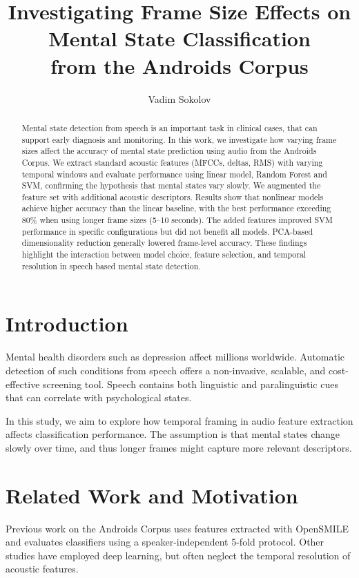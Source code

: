 \documentclass[conference]{IEEEtran}
\begin{document}
\title{\textbf{Investigating Frame Size Effects on Mental State Classification\\ from the Androids Corpus}}


\author{Vadim Sokolov}
\date{}

\maketitle

\begin{abstract}
Mental state detection from speech is an important task in clinical cases, that can support early diagnosis and monitoring. 
In this work, we investigate how varying frame sizes affect the accuracy of mental state prediction using audio from the Androids Corpus. 
We extract standard acoustic features (MFCCs, deltas, RMS) with varying temporal windows and evaluate performance using linear model, Random Forest and SVM, confirming the hypothesis that mental states vary slowly. 
We augmented the feature set with additional acoustic descriptors. 
Results show that nonlinear models achieve higher accuracy than the linear baseline, with the best performance exceeding 80\% when using longer frame sizes (5–10 seconds). 
The added features improved SVM performance in specific configurations but did not benefit all models. 
PCA-based dimensionality reduction generally lowered frame-level accuracy. 
These findings highlight the interaction between model choice, feature selection, and temporal resolution in speech based mental state detection.

\end{abstract}

\section{Introduction}
Mental health disorders such as depression affect millions worldwide. 
Automatic detection of such conditions from speech offers a non-invasive, scalable, and cost-effective screening tool. 
Speech contains both linguistic and paralinguistic cues that can correlate with psychological states.

In this study, we aim to explore how temporal framing in audio feature extraction affects classification performance. 
The assumption is that mental states change slowly over time, and thus longer frames might capture more relevant descriptors.

\section{Related Work and Motivation}
Previous work on the Androids Corpus \cite{androids2021} uses features extracted with OpenSMILE and evaluates classifiers using a speaker-independent 5-fold protocol. Other studies have employed deep learning, but often neglect the temporal resolution of acoustic features.
\end{document}

